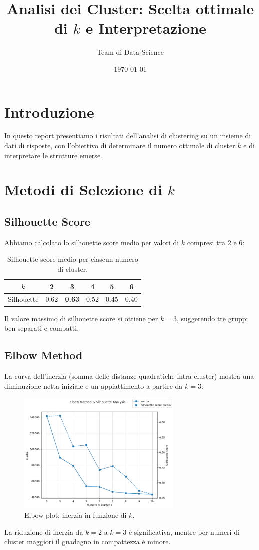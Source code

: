 \documentclass[a4paper,12pt]{article}
\title{Analisi dei Cluster: Scelta ottimale di $k$ e Interpretazione}
\author{Team di Data Science}
\date{\today}
\begin{document}
\maketitle

\section{Introduzione}
In questo report presentiamo i risultati dell'analisi di clustering su un insieme di dati di risposte, con l'obiettivo di determinare il numero ottimale di cluster $k$ e di interpretare le strutture emerse.

\section{Metodi di Selezione di $k$}
\subsection{Silhouette Score}
Abbiamo calcolato lo silhouette score medio per valori di $k$ compresi tra 2 e 6:
\begin{table}[h!]
  \centering
  \begin{tabular}{cccccc}
    \toprule
    $k$ & 2 & 3 & 4 & 5 & 6 \\
    \midrule
    Silhouette & 0.62 & \textbf{0.63} & 0.52 & 0.45 & 0.40 \\
    \bottomrule
  \end{tabular}
  \caption{Silhouette score medio per ciascun numero di cluster.}
  \label{tab:silhouette}
\end{table}
Il valore massimo di silhouette score si ottiene per $k=3$, suggerendo tre gruppi ben separati e compatti.

\subsection{Elbow Method}
La curva dell'inerzia (somma delle distanze quadratiche intra-cluster) mostra una diminuzione netta iniziale e un appiattimento a partire da $k=3$:\
\begin{figure}[h!]
  \centering
  \includegraphics[width=0.7\textwidth]{inertia_elbow.png}
  \caption{Elbow plot: inerzia in funzione di $k$.}
  \label{fig:elbow}
\end{figure}
La riduzione di inerzia da $k=2$ a $k=3$ è significativa, mentre per numeri di cluster maggiori il guadagno in compattezza è minore.
\end{document}
